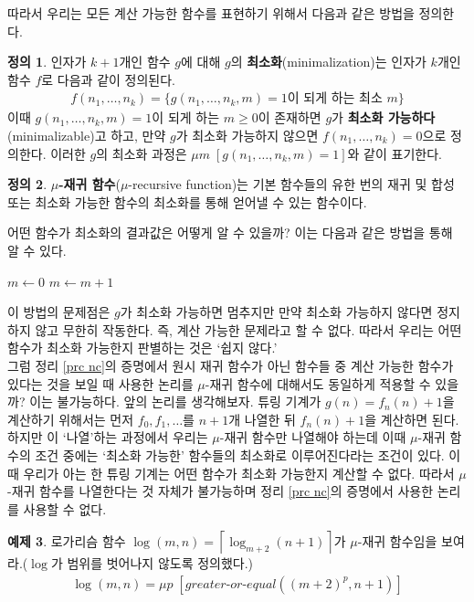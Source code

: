 \documentclass[b5paper, 11pt]{book}
\theoremstyle{definition}
\newtheorem{defn}{정의}[chapter]
\newtheorem{ex}[defn]{예제}
\begin{document}
따라서 우리는 모든 계산 가능한 함수를 표현하기 위해서 다음과 같은 방법을 정의한다.
\begin{defn} \label{minimalization}
    인자가 $k+1$개인 함수 $g$에 대해 $g$의 \textbf{최소화}(minimalization)는 인자가 $k$개인 함수 $f$로 다음과 같이 정의된다.
    \begin{align*}
        f(n_1, \ldots, n_k) = \{g(n_1, \ldots, n_k, m) = 1\text{이 되게 하는 최소 } m\}
    \end{align*}
    이때 $g(n_1, \ldots, n_k, m) = 1$이 되게 하는 $m \ge 0$이 존재하면 $g$가 \textbf{최소화 가능하다}(minimalizable)고 하고, 만약 $g$가 최소화 가능하지 않으면 $f(n_1, \ldots, n_k)=0$으로 정의한다. 이러한 $g$의 최소화 과정은 $\mu m \; [g(n_1, \ldots, n_k, m) = 1]$와 같이 표기한다. 
\end{defn}
\begin{defn}
    \textbf{$\mu$-재귀 함수}($\mu$-recursive function)는 기본 
    함수들의 유한 번의 재귀 및 합성 또는 최소화 가능한
    함수의 최소화를 통해 얻어낼 수 있는 함수이다. 
\end{defn}
어떤 함수가 최소화의 결과값은 어떻게 알 수 있을까? 이는 다음과 같은 방법을 통해 알 수 있다.
\begin{algorithmic}
        \State $m \gets 0$
            \State $m \gets m+1$
        \EndWhile
\end{algorithmic}
이 방법의 문제점은 $g$가 최소화 가능하면 멈추지만 만약 최소화 가능하지 않다면 정지하지 않고 무한히 작동한다. 즉, 계산 가능한 문제라고 할 수 없다. 따라서 우리는 어떤 함수가 최소화 가능한지 판별하는 것은 `쉽지 않다.'\\
그럼 정리 \ref{prc nc}의 증명에서 원시 재귀 함수가 아닌 함수들 중 계산 가능한 함수가 있다는 것을 보일 때 사용한 논리를 $\mu$-재귀 함수에 대해서도 동일하게 적용할 수 있을까? 이는 불가능하다. 앞의 논리를 생각해보자. 튜링 기계가 $g(n) = f_n(n) + 1$을 계산하기 위해서는 먼저 $f_0, f_1, \ldots$를 $n+1$개 나열한 뒤 $f_n(n) + 1$을 계산하면 된다. 하지만 이 `나열'하는 과정에서 우리는 $\mu$-재귀 함수만 나열해야 하는데 이때 $\mu$-재귀 함수의 조건 중에는 `최소화 가능한' 함수들의 최소화로 이루어진다라는 조건이 있다. 이때 우리가 아는 한 튜링 기계는 어떤 함수가 최소화 가능한지 계산할 수 없다. 따라서 $\mu$-재귀 함수를 나열한다는 것 자체가 불가능하며 정리 \ref{prc nc}의 증명에서 사용한 논리를 사용할 수 없다. 
\begin{ex}
    로가리슴 함수 $\log(m,n) = \left\lceil \log_{m+2}(n+1)\right\rceil$가 $\mu$-재귀 함수임을
    보여라.($\log $가 범위를 벗어나지 않도록 정의했다.)
    \begin{align*}
        \log(m,n) = \mu p \; [greater\text{-}or\text{-}equal((m+2)^p, n+1)]
    \end{align*}
\end{ex}
\end{document}
